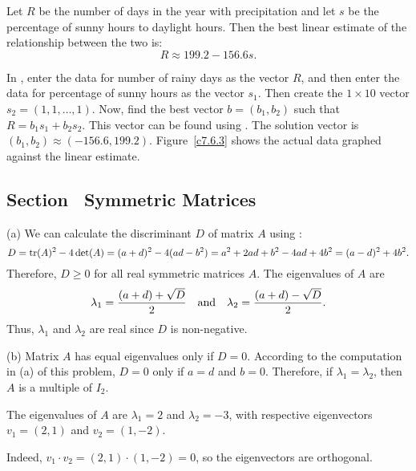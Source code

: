 \documentclass{ximera}
\begin{document}
\begin{figure}[htb]
		\centerline{%
		}
\end{figure}

\ans Let $R$ be the number of days in the year with precipitation and
let $s$ be the percentage of sunny hours to daylight hours.  Then the
best linear estimate of the relationship between the two is:
\[ R \approx 199.2 - 156.6s. \]

\soln In \Matlabp, enter the data for number of rainy days as the vector
$R$, and then enter the data for percentage of sunny hours as the vector
$s_1$.  Then create the $1 \times 10$ vector $s_2 = (1,1,\dots,1)$.  Now,
find the best vector $b = (b_1,b_2)$ such that $R = b_1s_1 + b_2s_2$. 
This vector can be found using .  The solution vector
is $(b_1,b_2) \approx (-156.6,199.2)$.  Figure~\ref{c7.6.3} shows the
actual data graphed against the linear estimate.

\begin{figure}[htb]
		\centerline{%
		}
\end{figure}


\subsection*{Section~\protect{\ref{S:symmetric}} Symmetric Matrices}

(a) We can calculate the discriminant $D$ of matrix $A$ using
:
\[ D = {\rm tr}(A)^2 - 4\det(A) = (a + d)^2 - 4(ad - b^2) =
a^2 + 2ad + b^2 - 4ad + 4b^2 = (a - d)^2 + 4b^2. \]
Therefore, $D \geq 0$ for all real symmetric matrices $A$.  The
eigenvalues of $A$ are
\[ \lambda_1 = \frac{(a + d) + \sqrt{D}}{2} \quad\mbox{and}\quad
\lambda_2 = \frac{(a + d) - \sqrt{D}}{2}. \]
Thus, $\lambda_1$ and $\lambda_2$ are real since $D$ is non-negative.

(b) Matrix $A$ has equal eigenvalues only if $D = 0$.  According to
the computation in (a) of this problem, $D = 0$ only if $a = d$ and
$b = 0$.  Therefore, if $\lambda_1 = \lambda_2$, then $A$ is a
multiple of $I_2$.

\ans The eigenvalues of $A$ are $\lambda_1 = 2$ and $\lambda_2 = -3$,
with respective eigenvectors $v_1 = (2,1)$ and $v_2 = (1,-2)$.

\soln Indeed, $v_1 \cdot v_2 = (2,1) \cdot (1,-2) = 0$, so the
eigenvectors are orthogonal.
\end{document}
